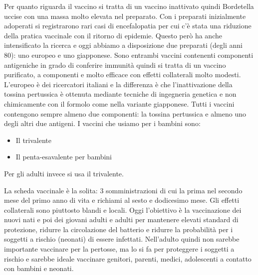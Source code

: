   Per quanto riguarda il vaccino si tratta di un vaccino inattivato
  quindi Bordetella uccise con una massa molto elevata nel preparato.
  Con i preparati inizialmente adoperati si registrarono rari casi di
  encefalopatia per cui c'è stata una riduzione della pratica vaccinale
  con il ritorno di epidemie. Questo però ha anche intensificato la
  ricerca e oggi abbiamo a disposizione due preparati (degli anni 80):
  uno europeo e uno giapponese. Sono entrambi vaccini contenenti
  componenti antigeniche in grado di conferire immunità quindi si tratta
  di un vaccino purificato, a componenti e molto efficace con effetti
  collaterali molto modesti. L'europeo è dei ricercatori italiani e la
  differenza è che l'inattivazione della tossina pertussica è ottenuta
  mediante tecniche di ingegneria genetica e non chimicamente con il
  formolo come nella variante giapponese. Tutti i vaccini contengono
  sempre almeno due componenti: la tossina pertussica e almeno uno degli
  altri due antigeni. I vaccini che usiamo per i bambini sono:

\begin{itemize}
\item
  Il trivalente
\item
  Il penta-esavalente per bambini
\end{itemize}
  Per gli adulti invece si usa il trivalente.

  La scheda vaccinale è la solita: 3 somministrazioni di cui la prima
  nel secondo mese del primo anno di vita e richiami al sesto e
  dodicesimo mese. Gli effetti collaterali sono piuttosto blandi e
  locali. Oggi l'obiettivo è la vaccinazione dei nuovi nati e poi dei
  giovani adulti e adulti per mantenere elevati standard di protezione,
  ridurre la circolazione del batterio e ridurre la probabilità per i
  soggetti a rischio (neonati) di essere infettati. Nell'adulto quindi
  non sarebbe importante vaccinare per la pertosse, ma lo si fa per
  proteggere i soggetti a rischio e sarebbe ideale vaccinare genitori,
  parenti, medici, adolescenti a contatto con bambini e neonati.